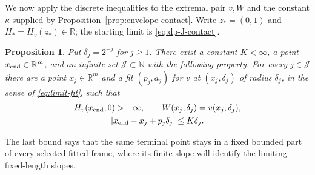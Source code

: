 \documentclass[11pt]{article}
\numberwithin{equation}{section}
\newtheorem{proposition}[theorem]{Proposition}
\theoremstyle{definition}
\theoremstyle{remark}
\newcommand{\R}{\mathbb{R}}
\begin{document}
We now apply the discrete inequalities to the extremal pair $v,W$ and the
constant $\kappa$ supplied by Proposition~\ref{prop:envelope-contact}.  Write
$z_*=(0,1)$ and $H_*=H_v(z_*)\in\R$; the starting limit is
\eqref{eq:dp-J-contact}.

\begin{proposition}\label{prop:contact-propagation}
Put $\delta_j=2^{-j}$ for $j\ge1$.  There exist a constant $K<\infty$, a point
$x_{\rm end}\in\R^m$, and an infinite set $\mathcal J\subset\mathbb N$ with the
following property.  For every $j\in\mathcal J$ there are a point
$x_j\in\R^m$ and a fit $(p_j,a_j)$ for $v$ at $(x_j,\delta_j)$ of radius
$\delta_j$, in the sense of \eqref{eq:limit-fit}, such that
\begin{equation}\label{eq:contact-propagation-conclusion}
\begin{gathered}
  H_v(x_{\rm end},0)>-\infty,\qquad
  W(x_j,\delta_j)=v(x_j,\delta_j),\\
  |x_{\rm end}-x_j+p_j\delta_j|\le K\delta_j.
\end{gathered}
\end{equation}
\end{proposition}

The last bound says that the same terminal point stays in a fixed bounded
part of every selected fitted frame, where its finite slope will identify
the limiting fixed-length slopes.
\end{document}
